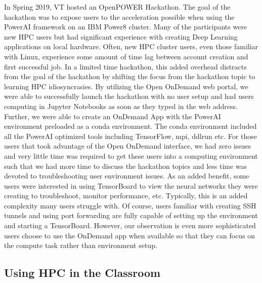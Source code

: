 \documentclass[runningheads]{llncs}
\begin{document}
In Spring 2019, VT hosted an OpenPOWER Hackathon.  The goal of the hackathon was to expose users to the acceleration possible when using the PowerAI framework on an IBM Power8 cluster.  Many of the participants were new HPC users but had significant experience with creating Deep Learning applications on local hardware.  Often, new HPC cluster users, even those familiar with Linux, experience some amount of time lag between account creation and first successful job.  In a limited time hackathon, this added overhead distracts from the goal of the hackathon by shifting the focus from the hackathon topic to learning HPC idiosyncrasies.  By utilizing the Open OnDemand web portal, we were able to successfully launch the hackathon with no user setup and had users computing in Jupyter Notebooks as soon as they typed in the web address.  Further, we were able to create an OnDemand App with the PowerAI environment preloaded as a conda environment.  The conda environment included all the PowerAI optimized tools including TensorFlow, mpi, ddlrun etc.  For those users that took advantage of the Open OnDemand interface, we had zero issues and very little time was required to get these users into a computing environment such that we had more time to discuss the hackathon topics and less time was devoted to troubleshooting user environment issues.  As an added benefit, some users were interested in using TensorBoard to view the neural networks they were creating to troubleshoot, monitor performance, etc.  Typically, this is an added complexity many users struggle with.  Of course, users familiar with creating SSH tunnels and using port forwarding are fully capable of setting up the environment and starting a TensorBoard.  However, our observation is even more sophisticated users choose to use the OnDemand app when available so that they can focus on the compute task rather than environment setup.


\subsection{Using HPC in the Classroom}
\end{document}
